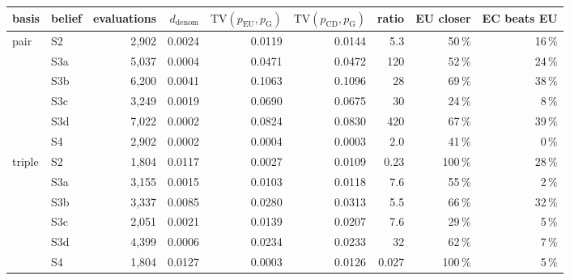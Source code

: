 \footnotesize
\begin{tabular}{llrrrrrrr}
\toprule
basis & belief & evaluations & $d_{\mathrm{denom}}$ & $\mathrm{TV}(p_{\mathrm{EU}},p_{\mathrm{G}})$ & $\mathrm{TV}(p_{\mathrm{CD}},p_{\mathrm{G}})$ & \multicolumn{1}{c}{ratio} & EU closer & EC beats EU \\
\midrule
pair & S2 & 2{,}902 & 0.0024 & 0.0119 & 0.0144 & 5.3 & 50\,\% & 16\,\% \\
 & S3a & 5{,}037 & 0.0004 & 0.0471 & 0.0472 & 120 & 52\,\% & 24\,\% \\
 & S3b & 6{,}200 & 0.0041 & 0.1063 & 0.1096 & 28 & 69\,\% & 38\,\% \\
 & S3c & 3{,}249 & 0.0019 & 0.0690 & 0.0675 & 30 & 24\,\% & 8\,\% \\
 & S3d & 7{,}022 & 0.0002 & 0.0824 & 0.0830 & 420 & 67\,\% & 39\,\% \\
 & S4 & 2{,}902 & 0.0002 & 0.0004 & 0.0003 & 2.0 & 41\,\% & 0\,\% \\
\midrule
triple & S2 & 1{,}804 & 0.0117 & 0.0027 & 0.0109 & 0.23 & 100\,\% & 28\,\% \\
 & S3a & 3{,}155 & 0.0015 & 0.0103 & 0.0118 & 7.6 & 55\,\% & 2\,\% \\
 & S3b & 3{,}337 & 0.0085 & 0.0280 & 0.0313 & 5.5 & 66\,\% & 32\,\% \\
 & S3c & 2{,}051 & 0.0021 & 0.0139 & 0.0207 & 7.6 & 29\,\% & 5\,\% \\
 & S3d & 4{,}399 & 0.0006 & 0.0234 & 0.0233 & 32 & 62\,\% & 7\,\% \\
 & S4 & 1{,}804 & 0.0127 & 0.0003 & 0.0126 & 0.027 & 100\,\% & 5\,\% \\
\bottomrule
\end{tabular}
